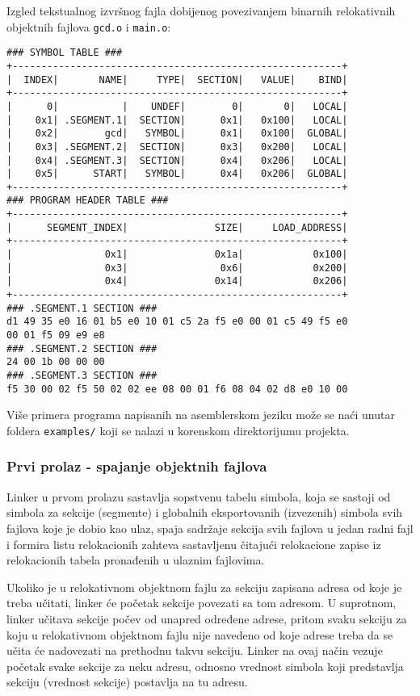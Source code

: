 Izgled tekstualnog izvršnog fajla dobijenog povezivanjem binarnih reloka\-tivnih
objektnih fajlova \texttt{gcd.o} i \texttt{main.o}:
\begin{lstlisting}
### SYMBOL TABLE ###
+---------------------------------------------------------+
|  INDEX|       NAME|     TYPE|  SECTION|   VALUE|    BIND|
+---------------------------------------------------------+
|      0|           |    UNDEF|        0|       0|   LOCAL|
|    0x1| .SEGMENT.1|  SECTION|      0x1|   0x100|   LOCAL|
|    0x2|        gcd|   SYMBOL|      0x1|   0x100|  GLOBAL|
|    0x3| .SEGMENT.2|  SECTION|      0x3|   0x200|   LOCAL|
|    0x4| .SEGMENT.3|  SECTION|      0x4|   0x206|   LOCAL|
|    0x5|      START|   SYMBOL|      0x4|   0x206|  GLOBAL|
+---------------------------------------------------------+
### PROGRAM HEADER TABLE ###
+---------------------------------------------------------+
|      SEGMENT_INDEX|               SIZE|     LOAD_ADDRESS|
+---------------------------------------------------------+
|                0x1|               0x1a|            0x100|
|                0x3|                0x6|            0x200|
|                0x4|               0x14|            0x206|
+---------------------------------------------------------+
### .SEGMENT.1 SECTION ###
d1 49 35 e0 16 01 b5 e0 10 01 c5 2a f5 e0 00 01 c5 49 f5 e0
00 01 f5 09 e9 e8 
### .SEGMENT.2 SECTION ###
24 00 1b 00 00 00 
### .SEGMENT.3 SECTION ###
f5 30 00 02 f5 50 02 02 ee 08 00 01 f6 08 04 02 d8 e0 10 00 
\end{lstlisting}

Više primera programa napisanih na asemblerskom jeziku može se naći
unutar foldera \texttt{examples/} koji se nalazi u korenskom direktorijumu
projekta.
\newpage %

\subsubsection{Prvi prolaz - spajanje objektnih fajlova}
Linker u prvom prolazu sastavlja sopstvenu tabelu simbola, koja se sastoji od
simbola za sekcije (segmente) i globalnih eksportovanih (izvezenih) simbola svih fajlova
koje je dobio kao ulaz, spaja sadržaje sekcija svih fajlova u jedan radni fajl
i formira listu relokacionih zahteva sastavljenu čitajući relokacione
zapise iz relokacionih tabela pronađenih u ulaznim fajlovima.

Ukoliko je u relokativnom objektnom fajlu za sekciju zapisana adresa od koje je
treba učitati, linker će početak sekcije povezati sa tom adresom. U suprotnom,
linker učitava sekcije počev od unapred određene adrese, pritom svaku sekciju
za koju u relokativnom objektnom fajlu nije navedeno od koje adrese treba da
se učita će nadovezati na prethodnu takvu sekciju. Linker na ovaj način vezuje
početak svake sekcije za neku adresu, odnosno vrednost simbola koji predstavlja
sekciju (vrednost sekcije) postavlja na tu adresu.

